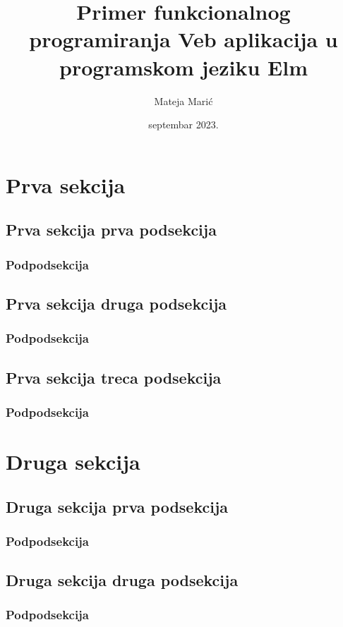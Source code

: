 \documentclass{viser-thesis}
\author{Mateja Marić}
\title{Primer funkcionalnog programiranja Veb aplikacija u programskom jeziku Elm}
\date{septembar 2023.}
\begin{document}
\maketitle
\tableofcontents
\newpage

\section{Prva sekcija}
\newpage
\subsection{Prva sekcija prva podsekcija}
\newpage
\subsubsection{Podpodsekcija}
\newpage
\subsection{Prva sekcija druga podsekcija}
\newpage
\subsubsection{Podpodsekcija}
\newpage
\subsection{Prva sekcija treca podsekcija}
\newpage
\subsubsection{Podpodsekcija}
\newpage

\section{Druga sekcija}
\newpage
\subsection{Druga sekcija prva podsekcija}
\newpage
\subsubsection{Podpodsekcija}
\newpage
\subsection{Druga sekcija druga podsekcija}
\newpage
\subsubsection{Podpodsekcija}
\newpage
\end{document}
